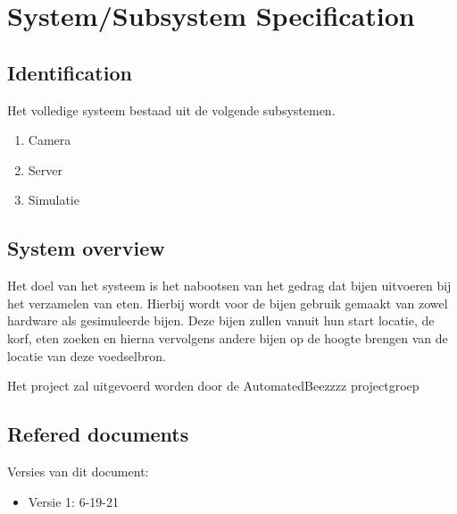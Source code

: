 \section{System/Subsystem Specification}


\subsection{Identification}
Het volledige systeem bestaad uit de volgende subsystemen.
\begin{enumerate}
    \item Camera
    \item Server
    \item Simulatie
\end{enumerate}

\subsection{System overview}
Het doel van het systeem is het nabootsen van het gedrag dat bijen uitvoeren bij het verzamelen van eten.
Hierbij wordt voor de bijen gebruik gemaakt van zowel hardware als gesimuleerde bijen. 
Deze bijen zullen vanuit hun start locatie, de korf, eten zoeken 
en hierna vervolgens andere bijen op de hoogte brengen van de locatie van deze voedselbron.

Het project zal uitgevoerd worden door de AutomatedBeezzzz projectgroep

\subsection{Refered documents}
Versies van dit document:
\begin{itemize}
    \item Versie 1: 6-19-21
\end{itemize}
